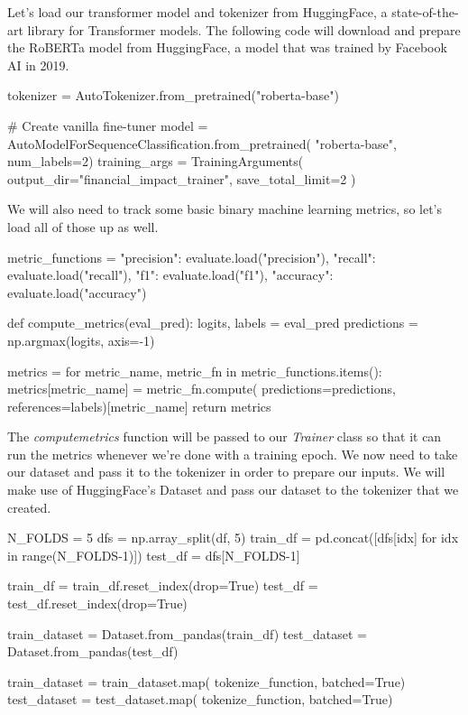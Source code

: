 Let's load our transformer model and tokenizer from HuggingFace\cite{wolf2020huggingfaces}, a state-of-the-art library for Transformer models.
The following code will download and prepare the RoBERTa\cite{liu2019roberta} model from HuggingFace, a model that was trained by Facebook AI in 2019.

\begin{python}
tokenizer = AutoTokenizer.from_pretrained("roberta-base")

# Create vanilla fine-tuner
model = AutoModelForSequenceClassification.from_pretrained(
    "roberta-base", num_labels=2)
training_args = TrainingArguments(
    output_dir="financial_impact_trainer",
    save_total_limit=2
)
\end{python}

We will also need to track some basic binary machine learning metrics, so let's load all of those up as well.

\begin{python}
metric_functions = {
    "precision": evaluate.load("precision"),
    "recall": evaluate.load("recall"),
    "f1": evaluate.load("f1"),
    "accuracy": evaluate.load("accuracy")
}

def compute_metrics(eval_pred):
    logits, labels = eval_pred
    predictions = np.argmax(logits, axis=-1)

    metrics = {}
    for metric_name, metric_fn in metric_functions.items():
        metrics[metric_name] = metric_fn.compute(
            predictions=predictions,
            references=labels)[metric_name]
    return metrics
\end{python}

The \textit{compute\textunderscore metrics} function will be passed to our \textit{Trainer} class so that it can run the metrics whenever we're done with a training epoch. We now need to take our dataset and pass it to the tokenizer in order to prepare our inputs. We will make use of HuggingFace's Dataset and pass our dataset to the tokenizer that we created.

\begin{python}
N_FOLDS = 5
dfs = np.array_split(df, 5)
train_df = pd.concat([dfs[idx] for idx in range(N_FOLDS-1)])
test_df = dfs[N_FOLDS-1]

train_df = train_df.reset_index(drop=True)
test_df = test_df.reset_index(drop=True)

train_dataset = Dataset.from_pandas(train_df)
test_dataset = Dataset.from_pandas(test_df)

train_dataset = train_dataset.map(
    tokenize_function, batched=True)
test_dataset = test_dataset.map(
    tokenize_function, batched=True)
\end{python}

